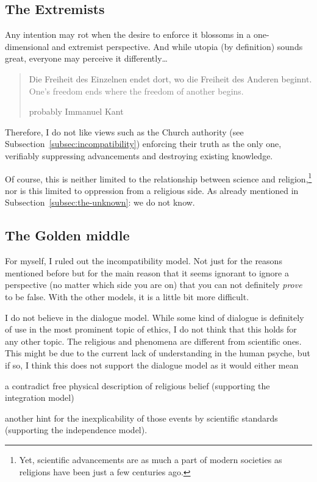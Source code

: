 \subsection{The Extremists}
Any intention may rot when the desire to enforce it blossoms in a one-dimensional and extremist perspective.
And while utopia (by definition) sounds great, everyone may perceive it differently\ldots
\blockquote[probably Immanuel Kant]{Die Freiheit des Einzelnen endet dort, wo die Freiheit des Anderen beginnt.\\\textcolor{gray}{One's freedom ends where the freedom of another begins.}}
Therefore, I do not like views such as the Church authority (see Subsection~\ref{subsec:incompatibility}) enforcing their truth as the only one, verifiably suppressing advancements and destroying existing knowledge.

Of course, this is neither limited to the relationship between science and religion,\footnote{Yet, scientific advancements are as much a part of modern societies as religions have been just a few centuries ago.} nor is this limited to oppression from a religious side. As already mentioned in Subsection~\ref{subsec:the-unknown}: we do not know.


\subsection{The Golden middle}
\label{subsec:golden-middle}
For myself, I ruled out the incompatibility model. Not just for the reasons mentioned before but for the main reason that it seems ignorant to ignore a perspective (no matter which side you are on) that you can not definitely \emph{prove} to be false.
With the other models, it is a little bit more difficult.

I do not believe in the dialogue model. While some kind of dialogue is definitely of use in the most prominent topic of ethics, I do not think that this holds for any other topic. The religious  and phenomena are different from scientific ones. This might be due to the current lack of understanding in the human psyche, but if so, I think this does not support the dialogue model as it would either mean \begin{orlist}
    \item a contradict free physical description of religious belief (supporting the integration model)
    \item another hint for the inexplicability of those events by scientific standards (supporting the independence model).
\end{orlist}

